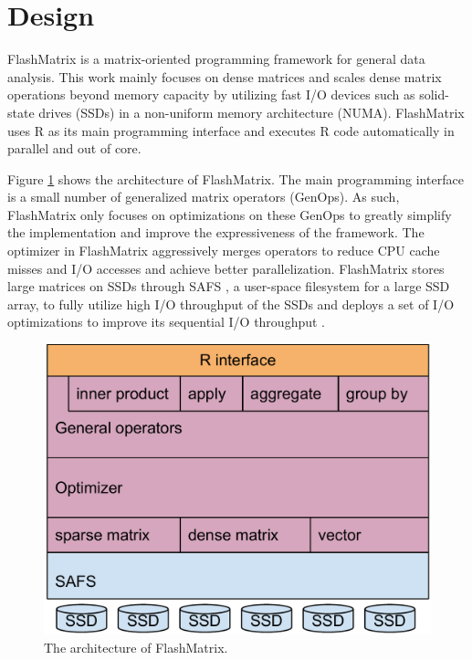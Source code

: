 \section{Design}

FlashMatrix is a matrix-oriented programming framework for general data analysis.
This work mainly focuses on dense matrices and scales
dense matrix operations beyond memory capacity by utilizing fast I/O devices
such as solid-state drives (SSDs) in a non-uniform memory architecture (NUMA).
FlashMatrix uses R as its main programming interface and executes R code
automatically in parallel and out of core.

Figure \ref{fig:arch} shows the architecture of FlashMatrix. The main programming
interface is a small number of generalized matrix operators (GenOps). As such,
FlashMatrix only focuses on optimizations on these GenOps
to greatly simplify the implementation and improve the expressiveness of
the framework. The optimizer in FlashMatrix aggressively merges operators to
reduce CPU cache misses and I/O accesses and achieve better parallelization.
FlashMatrix stores large matrices on SSDs through SAFS \cite{safs},
a user-space filesystem for a large SSD array, to fully utilize high I/O
throughput of the SSDs and deploys a set of I/O optimizations to improve
its sequential I/O throughput \cite{SEM_SpMM}.

\begin{figure}
\centering
\includegraphics[scale=0.3]{./architecture.pdf}
\caption{The architecture of FlashMatrix.}
\label{fig:arch}
\end{figure}

